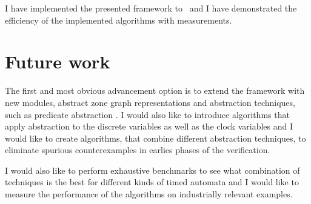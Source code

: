 I have implemented the presented framework to \ttmc\ and I have demonstrated the efficiency of the implemented algorithms with measurements.

\section{Future work}

The first and most obvious advancement option is to extend the framework with new modules, abstract zone graph representations and abstraction techniques, such as predicate abstraction \cite{Graf97a}. I would also like to introduce algorithms that apply abstraction to the discrete variables as well as the clock variables and I would like to create algorithms, that combine different abstraction techniques, to eliminate spurious counterexamples in earlies phases of the verification.

I would also like to perform exhaustive benchmarks to see what combination of techniques is the best for different kinds of timed automata and I would like to measure the performance of the algorithms on industrially relevant examples.